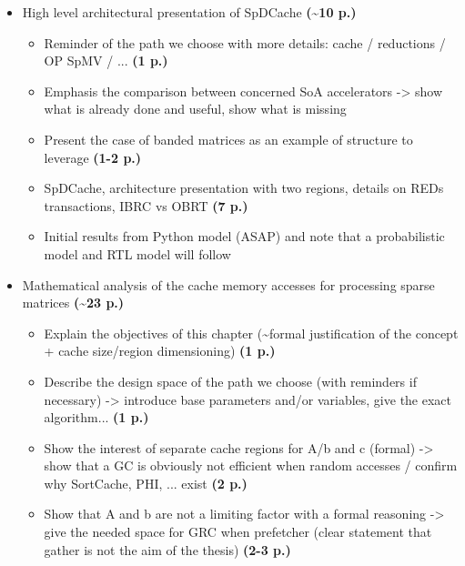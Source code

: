 \begin{itemize}
\begin{itemize}
        \item Problem of comparison / comparison of standalone / other analysis (issue of matrix structure) -> Objectives: convince reader that SoA was done in depth, and acknoledge the matrice structure issue \textbf{(1 p.)}
        \item Takeaways -> paths for designing an accelerator (end od SoA paper) \textbf{(1-2 p.)}
        \item We choose a path -> show which one (coarse grain, at the level of the SoA, comparable to SortCache, PHI...)
    \end{itemize}
    \item High level architectural presentation of SpDCache \textbf{(\textasciitilde 10 p.)}
    \begin{itemize}
        \item Reminder of the path we choose with more details: cache / reductions / OP SpMV / ... \textbf{(1 p.)}
        \item Emphasis the comparison between concerned SoA accelerators -> show what is already done and useful, show what is missing
        \item Present the case of banded matrices as an example of structure to leverage \textbf{(1-2 p.)}
        \item SpDCache, architecture presentation with two regions, details on REDs transactions, IBRC vs OBRT \textbf{(7 p.)}
        \item Initial results from Python model (ASAP) and note that a probabilistic model and RTL model will follow
    \end{itemize}
    \item Mathematical analysis of the cache memory accesses for processing sparse matrices \textbf{(\textasciitilde 23 p.)}
    \begin{itemize}
        \item Explain the objectives of this chapter (\textasciitilde formal justification of the concept + cache size/region dimensioning) \textbf{(1 p.)}
        \item Describe the design space of the path we choose (with reminders if necessary) -> introduce base parameters and/or variables, give the exact algorithm... \textbf{(1 p.)}
        \item Show the interest of separate cache regions for A/b and c (formal) -> show that a GC is obviously not efficient when random accesses / confirm why SortCache, PHI, ... exist \textbf{(2 p.)}
        \item Show that A and b are not a limiting factor with a formal reasoning -> give the needed space for GRC when prefetcher (clear statement that gather is not the aim of the thesis) \textbf{(2-3 p.)}

\end{itemize}
\end{itemize}
